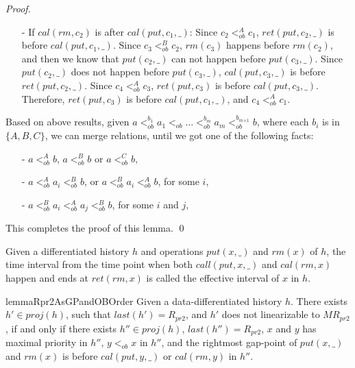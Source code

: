 \documentclass{llncs}
\begin{document}
\begin {proof}
\begin{itemize}
\begin{itemize}
    \item[-] If $\textit{cal}(\textit{rm},c_2)$ is after $\textit{cal}(\textit{put},c_1,\_)$: Since $c_2 <_{\textit{ob}}^A c_1$, $\textit{ret}(\textit{put},c_2,\_)$ is before $\textit{cal}(\textit{put},c_1,\_)$. Since $c_3 <_{\textit{ob}}^B c_2$, $\textit{rm}(c_3)$ happens before $\textit{rm}(c_2)$, and then we know that $\textit{put}(c_2,\_)$ can not happen before $\textit{put}(c_3,\_)$. Since $\textit{put}(c_2,\_)$ does not happen before $\textit{put}(c_3,\_)$, $\textit{cal}(\textit{put},c_3,\_)$ is before $\textit{ret}(\textit{put},c_2,\_)$. Since $c_4 <_{\textit{ob}}^A c_3$, $\textit{ret}(\textit{put},c_3)$ is before $\textit{cal}(\textit{put},c_3,\_)$. Therefore, $\textit{ret}(\textit{put},c_3)$ is before $\textit{cal}(\textit{put},c_1,\_)$, and $c_4 <_{\textit{ob}}^A c_1$.
    \end{itemize}

\end{itemize}

Based on above results, given $a <_{\textit{ob}}^{b_1} a_1 <_{\textit{ob}} \ldots <_{\textit{ob}}^{b_m} a_m <_{\textit{ob}}^{b_{\textit{m+1}}} b$, where each $b_i$ is in $\{ A,B,C \}$, we can merge relations, until we got one of the following facts:

\begin{itemize}
\setlength{\itemsep}{0.5pt}
\item[-] $a <_{\textit{ob}}^A b$, $a <_{\textit{ob}}^B b$ or $a <_{\textit{ob}}^C b$,

\item[-] $a <_{\textit{ob}}^A a_i <_{\textit{ob}}^B b$, or $a <_{\textit{ob}}^B a_i <_{\textit{ob}}^A b$, for some $i$,

\item[-] $a <_{\textit{ob}}^B a_i <_{\textit{ob}}^A a_j <_{\textit{ob}}^B b$, for some $i$ and $j$,
\end{itemize}

This completes the proof of this lemma. \qed
\end {proof}


Given a differentiated history $h$ and operations $\textit{put}(x,\_)$ and $\textit{rm}(x)$ of $h$, the time interval from the time point when both $\textit{call}(\textit{put},x,\_)$ and $\textit{cal}(\textit{rm},x)$ happen and ends at $\textit{ret}(\textit{rm},x)$ is called the effective interval of $x$ in $h$.


\begin{restatable}{lemma}{Rpr2AsGPandOBOrder}
\label{lemma:Rpr2 as gap-point and ob order}
Given a data-differentiated history $h$. There exists $h' \in \textit{proj}(h)$, such that $\textit{last}(h') = R_{\textit{pr2}}$, and $h'$ does not linearizable to $\textit{MR}_{\textit{pr2}}$, if and only if there exists $h'' \in \textit{proj}(h)$, $\textit{last}(h'') = R_{\textit{pr2}}$, $x$ and $y$ has maximal priority in $h''$, $y <_{\textit{ob}} x$ in $h''$, and the rightmost gap-point of $\textit{put}(x,\_)$ and $\textit{rm}(x)$ is before $\textit{cal}(\textit{put},y,\_)$ or $\textit{cal}(\textit{rm},y)$ in $h''$.
\end{restatable}
\end{document}
